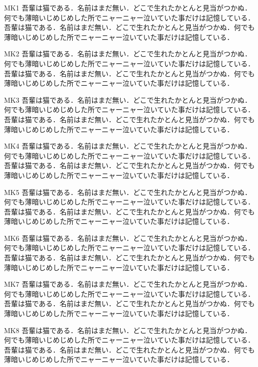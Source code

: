 \documentclass[fontsize=10pt,twocolumn]{jlreq}
\begin{document}
MK1 吾輩は猫である．名前はまだ無い．どこで生れたかとんと見当がつかぬ．何でも薄暗いじめじめした所でニャーニャー泣いていた事だけは記憶している． 吾輩は猫である．名前はまだ無い．どこで生れたかとんと見当がつかぬ．何でも薄暗いじめじめした所でニャーニャー泣いていた事だけは記憶している．\par
{}MK2 吾輩は猫である．名前はまだ無い．どこで生れたかとんと見当がつかぬ．何でも薄暗いじめじめした所でニャーニャー泣いていた事だけは記憶している． 吾輩は猫である．名前はまだ無い．どこで生れたかとんと見当がつかぬ．何でも薄暗いじめじめした所でニャーニャー泣いていた事だけは記憶している．\par
{}MK3 吾輩は猫である．名前はまだ無い．どこで生れたかとんと見当がつかぬ．何でも薄暗いじめじめした所でニャーニャー泣いていた事だけは記憶している． 吾輩は猫である．名前はまだ無い．どこで生れたかとんと見当がつかぬ．何でも薄暗いじめじめした所でニャーニャー泣いていた事だけは記憶している．\par
{}MK4 吾輩は猫である．名前はまだ無い．どこで生れたかとんと見当がつかぬ．何でも薄暗いじめじめした所でニャーニャー泣いていた事だけは記憶している． 吾輩は猫である．名前はまだ無い．どこで生れたかとんと見当がつかぬ．何でも薄暗いじめじめした所でニャーニャー泣いていた事だけは記憶している．\par
{}MK5 吾輩は猫である．名前はまだ無い．どこで生れたかとんと見当がつかぬ．何でも薄暗いじめじめした所でニャーニャー泣いていた事だけは記憶している． 吾輩は猫である．名前はまだ無い．どこで生れたかとんと見当がつかぬ．何でも薄暗いじめじめした所でニャーニャー泣いていた事だけは記憶している．\par
{}MK6 吾輩は猫である．名前はまだ無い．どこで生れたかとんと見当がつかぬ．何でも薄暗いじめじめした所でニャーニャー泣いていた事だけは記憶している． 吾輩は猫である．名前はまだ無い．どこで生れたかとんと見当がつかぬ．何でも薄暗いじめじめした所でニャーニャー泣いていた事だけは記憶している．\par
{}MK7 吾輩は猫である．名前はまだ無い．どこで生れたかとんと見当がつかぬ．何でも薄暗いじめじめした所でニャーニャー泣いていた事だけは記憶している． 吾輩は猫である．名前はまだ無い．どこで生れたかとんと見当がつかぬ．何でも薄暗いじめじめした所でニャーニャー泣いていた事だけは記憶している．\par
{}MK8 吾輩は猫である．名前はまだ無い．どこで生れたかとんと見当がつかぬ．何でも薄暗いじめじめした所でニャーニャー泣いていた事だけは記憶している． 吾輩は猫である．名前はまだ無い．どこで生れたかとんと見当がつかぬ．何でも薄暗いじめじめした所でニャーニャー泣いていた事だけは記憶している．\par
\end{document}
